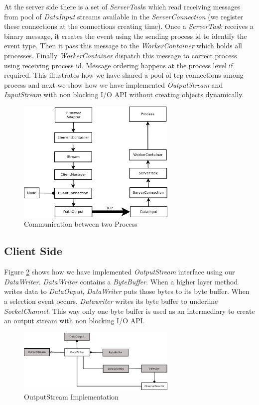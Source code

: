 At the server side there is a set of \textit{ServerTask}s which read receiving messages from pool of \textit{DataInput} streams available in the \textit{ServerConnection} (we register these connections at the connections creating time). Once a \textit{ServerTask} receives a binary message, it creates the event using the sending process id to identify the event type. Then it pass this message to the \textit{WorkerContainer} which holds all processes. Finally \textit{WorkerContainer} dispatch this message to correct process using receiving process id. Message ordering happens at the process level if required. This illustrates how we have shared a pool of tcp connections among process and next we show how we have implemented \textit{OutputStream} and \textit{InputStream} with non blocking I/O API without  creating objects dynamically.
\begin{figure}[!tii]
        \centering
        \includegraphics[width=3.0in]{interprocess.png}
        \caption{Communication between two Process}
        \label{interprocess}
\end{figure}
\subsection{Client Side}
Figure \ref{client} shows how we have implemented \textit{OutputStream} interface using our \textit{DataWriter}. \textit{DataWriter} contains a \textit{ByteBuffer}. When a higher layer method writes data to \textit{DataOuput}, \textit{DataWriter} puts those bytes to its byte buffer. When a selection event occurs, \textit{Datawriter} writes its byte buffer to underline \textit{SocketChannel}. This way only one byte buffer is used as an intermediary to create an output stream with non blocking I/O API.
\begin{figure}[!t]
        \centering
        \includegraphics[width=3.0in]{client.png}
        \caption{OutputStream Implementation}
        \label{client}
\end{figure}
